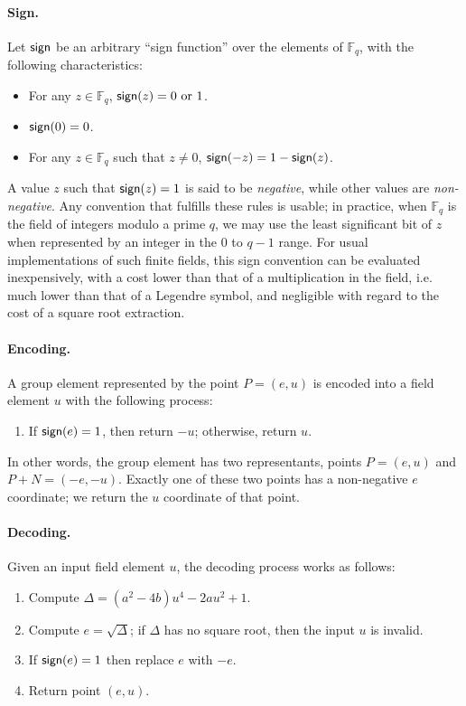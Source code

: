 \documentclass{llncs}
\newcommand{\bF}{\mathbb{F}}
\newcommand{\sign}{\text{\textsf{sign}}}
\begin{document}
\paragraph{Sign.}
Let $\sign$ be an arbitrary ``sign function'' over the elements of
$\bF_q$, with the following characteristics:
\begin{itemize}

    \item For any $z \in \bF_q$, $\sign(z) = 0 \text{\ or\ } 1$.

    \item $\sign(0) = 0$.

    \item For any $z \in \bF_q$ such that $z \neq 0$,
    $\sign(-z) = 1 - \sign(z)$.

\end{itemize}
A value $z$ such that $\sign(z) = 1$ is said to be \emph{negative},
while other values are \emph{non-negative}. Any convention that fulfills
these rules is usable; in practice, when $\bF_q$ is the field of
integers modulo a prime $q$, we may use the least significant bit of $z$
when represented by an integer in the 0 to $q-1$ range. For usual
implementations of such finite fields, this sign convention can be
evaluated inexpensively, with a cost lower than that of a multiplication
in the field, i.e. much lower than that of a Legendre symbol, and
negligible with regard to the cost of a square root extraction.

\paragraph{Encoding.}
A group element represented by the point $P = (e,u)$ is encoded into a
field element $u$ with the following process:
\begin{enumerate}

    \item If $\sign(e) = 1$, then return $-u$; otherwise, return $u$.

\end{enumerate}
In other words, the group element has two representants, points
$P = (e,u)$ and $P+N = (-e,-u)$. Exactly one of these two points has
a non-negative $e$ coordinate; we return the $u$ coordinate of that
point.

\paragraph{Decoding.}
Given an input field element $u$, the decoding process works as follows:
\begin{enumerate}

    \item Compute $\Delta = (a^2-4b) u^4 - 2a u^2 + 1$.

    \item Compute $e = \sqrt{\Delta}$; if $\Delta$ has no square root,
    then the input $u$ is invalid.

    \item If $\sign(e) = 1$ then replace $e$ with $-e$.

    \item Return point $(e, u)$.

\end{enumerate}
\end{document}
